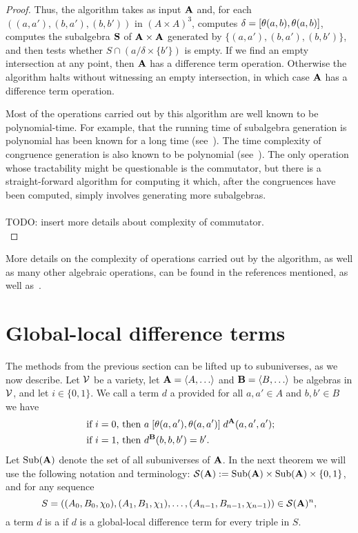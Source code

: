 \begin{proof}
    Thus, the algorithm takes as input $\mathbf{A}$ and, for each 
    $((a,a'), (b,a'), (b,b'))$ in $(A\times A)^3$, computes
    $\delta = [\theta(a,b), \theta(a,b)]$, computes the subalgebra
    $\mathbf{S}$ of $\mathbf{A}\times \mathbf{A}$ generated by
    $\{(a,a'), (b,a'), (b,b')\}$, and then
    tests whether $S \cap (a/\delta \times \{b'\})$ is empty.
    If we find an empty intersection at any point, then
    $\mathbf{A}$ has a difference term operation.
    Otherwise the algorithm halts without witnessing an empty
    intersection, in which case $\mathbf{A}$ has a difference term operation.

    Most of the operations carried out by this algorithm are well known to be
    polynomial-time.  For example, that the running time of subalgebra generation is
    polynomial has been known for a long time (see~\cite{MR0455543}).
    The time complexity of congruence generation is also known to be polynomial
    (see~\cite{MR2470585}).  The only operation whose tractability might be 
    questionable is the commutator, but there is a straight-forward algorithm for
    computing it which, after the congruences have been computed, simply
    involves generating more subalgebras.
    \\\\
    TODO: insert more details about complexity of commutator.\\
\end{proof}


More details on the complexity of operations carried out by the algorithm, as well as many other algebraic operations, can be found in the references mentioned, as well as~\cite{MR1871085,MR1695293,Freese:2009}. 


\section{Global-local difference terms}
\label{sec:glob-local-diff}
The methods from the previous section can be lifted
up to subuniverses, as we now describe.
Let $\mathcal{V}$ be a variety, let $\bA = \<A, \dots\>$ and $\bB = \<B, \dots\>$ be algebras in
$\mathcal{V}$, and let $i\in \{0,1\}$.
We call a term $d$ a 
provided for all $a, a'\in A$ and $b, b' \in B$ we have
\begin{align}
\text{ if $i=0$, then } & a \comm{\theta(a,a')}{\theta(a,a')} d^{\bA}(a,a',a');
\label{eq:global-diff-triple}\\
\text{ if $i=1$, then } &
d^{\bB}(b,b,b') = b'. 
\end{align}
Let $\operatorname{Sub}(\mathbf{A})$ denote the set of all
subuniverses of $\mathbf{A}$. In the next theorem we will use the following notation and terminology:
$\mathcal{S}(\mathbf{A}):= \operatorname{Sub}(\mathbf{A}) \times \operatorname{Sub}(\mathbf{A}) \times \{0,1\}$, and for any
sequence
\[S = ((A_0, B_0, \chi_0), (A_1, B_1, \chi_1), \dots,
(A_{n-1},B_{n-1},\chi_{n-1})) \in \mathcal{S}(\mathbf{A})^n,
\]
a term $d$ is a 
if $d$ is a global-local difference term for every triple in $S$.

